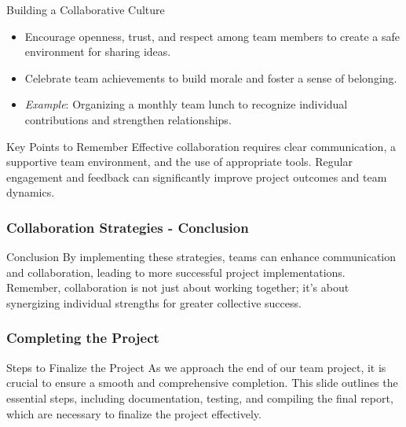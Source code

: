 \documentclass{beamer}
\begin{document}
\begin{frame}[fragile]
    \begin{block}{Building a Collaborative Culture}
        \begin{itemize}
            \item Encourage openness, trust, and respect among team members to create a safe environment for sharing ideas.
            \item Celebrate team achievements to build morale and foster a sense of belonging.
            \item \textit{Example}: Organizing a monthly team lunch to recognize individual contributions and strengthen relationships.
        \end{itemize}
    \end{block}

    \begin{block}{Key Points to Remember}
        Effective collaboration requires clear communication, a supportive team environment, and the use of appropriate tools. Regular engagement and feedback can significantly improve project outcomes and team dynamics.
    \end{block}
\end{frame}

\begin{frame}[fragile]
    \frametitle{Collaboration Strategies - Conclusion}
    \begin{block}{Conclusion}
        By implementing these strategies, teams can enhance communication and collaboration, leading to more successful project implementations. Remember, collaboration is not just about working together; it's about synergizing individual strengths for greater collective success.
    \end{block}
\end{frame}

\begin{frame}[fragile]
    \frametitle{Completing the Project}
    \begin{block}{Steps to Finalize the Project}
        As we approach the end of our team project, it is crucial to ensure a smooth and comprehensive completion. 
        This slide outlines the essential steps, including documentation, testing, and compiling the final report, 
        which are necessary to finalize the project effectively.
    \end{block}
\end{frame}
\end{document}
